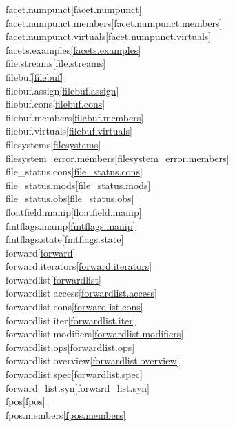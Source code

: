 \begin{multicols}{2}
facet.numpunct\quad\ref{facet.numpunct}\\
facet.numpunct.members\quad\ref{facet.numpunct.members}\\
facet.numpunct.virtuals\quad\ref{facet.numpunct.virtuals}\\
facets.examples\quad\ref{facets.examples}\\
file.streams\quad\ref{file.streams}\\
filebuf\quad\ref{filebuf}\\
filebuf.assign\quad\ref{filebuf.assign}\\
filebuf.cons\quad\ref{filebuf.cons}\\
filebuf.members\quad\ref{filebuf.members}\\
filebuf.virtuals\quad\ref{filebuf.virtuals}\\
filesystems\quad\ref{filesystems}\\
filesystem_error.members\quad\ref{filesystem_error.members}\\
file_status.cons\quad\ref{file_status.cons}\\
file_status.mods\quad\ref{file_status.mods}\\
file_status.obs\quad\ref{file_status.obs}\\
floatfield.manip\quad\ref{floatfield.manip}\\
fmtflags.manip\quad\ref{fmtflags.manip}\\
fmtflags.state\quad\ref{fmtflags.state}\\
forward\quad\ref{forward}\\
forward.iterators\quad\ref{forward.iterators}\\
forwardlist\quad\ref{forwardlist}\\
forwardlist.access\quad\ref{forwardlist.access}\\
forwardlist.cons\quad\ref{forwardlist.cons}\\
forwardlist.iter\quad\ref{forwardlist.iter}\\
forwardlist.modifiers\quad\ref{forwardlist.modifiers}\\
forwardlist.ops\quad\ref{forwardlist.ops}\\
forwardlist.overview\quad\ref{forwardlist.overview}\\
forwardlist.spec\quad\ref{forwardlist.spec}\\
forward_list.syn\quad\ref{forward_list.syn}\\
fpos\quad\ref{fpos}\\
fpos.members\quad\ref{fpos.members}\\

\end{multicols}
